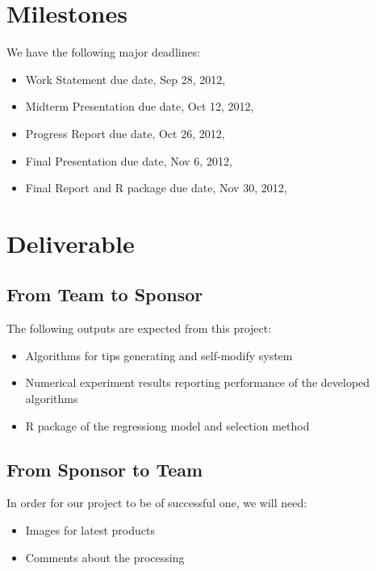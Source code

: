 \documentclass[12pt,letterpaper]{article}
\theoremstyle{definition}
\begin{document}
\section{Milestones}
We have the following major deadlines:
\begin{itemize}
    \item Work Statement due date, Sep 28, 2012,
    \item Midterm Presentation due date, Oct 12, 2012,
    \item Progress Report due date, Oct 26, 2012,
    \item Final Presentation due date, Nov 6, 2012,
    \item Final Report and R package due date, Nov 30, 2012,

\end{itemize}

\section{Deliverable}
\subsection{From Team to Sponsor} %
The following outputs are expected from this project:
\begin{itemize}
    \item Algorithms for tips generating and self-modify system
    \item Numerical experiment results reporting performance of the developed algorithms
    \item R package of the regressiong model and selection method
\end{itemize}

\subsection{From Sponsor to Team} %

In order for our project to be of successful one, we will need:
\begin{itemize}
    \item Images for latest products
    \item Comments about the processing
\end{itemize}


%
%
\end{document}
